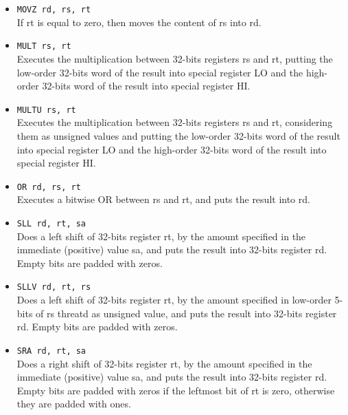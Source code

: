 \documentclass[12pt]{report}
\begin{document}
\begin{itemize}
	\item \texttt{MOVZ rd, rs, rt}\\
	If rt is equal to zero, then moves the content of rs into rd.

	\item \texttt{MULT rs, rt}\\
	Executes the multiplication between 32-bits registers rs and rt, putting the low-order 32-bits word
	of the result into special register LO and the high-order 32-bits word of the result into special
	register HI.

	\item \texttt{MULTU rs, rt}\\
	Executes the multiplication between 32-bits registers rs and rt, considering them as unsigned
  	values and putting the low-order 32-bits word of the result into special register LO 
	and the high-order 32-bits word of the result into special register HI.
	
	\item \texttt{OR rd, rs, rt}\\
	Executes a bitwise OR between rs and rt, and puts the result into rd.

	\item \texttt{SLL rd, rt, sa}\\
	Does a left shift of 32-bits register rt, by the amount specified in the immediate (positive) value sa,
	and puts the result into 32-bits register rd. Empty bits are padded with zeros.

	\item \texttt{SLLV rd, rt, rs}\\
	Does a left shift of 32-bits register rt, by the amount specified in low-order 5-bits of rs threatd as unsigned value,
	and puts the result into 32-bits register rd. Empty bits are padded with zeros.

	\item \texttt{SRA rd, rt, sa}\\
	Does a right shift of 32-bits register rt, by the amount specified in the immediate (positive) value sa,
	and puts the result into 32-bits register rd. Empty bits are padded with zeros if the leftmost bit
	of rt is zero, otherwise they are padded with ones.


\end{itemize}
\end{document}
